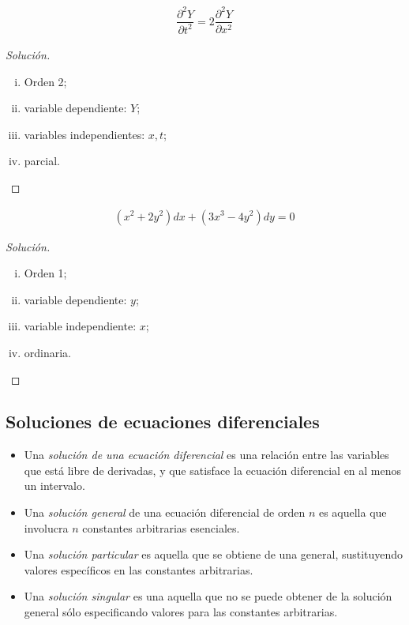 

\begin{align*}
	\dfrac{\partial^{2}Y}{\partial t^{2}} = 2\dfrac{\partial^{2}Y}{\partial x^{2}}
\end{align*}
\begin{proof}[Solución]
	\begin{enumerate}[(i)]
		\item Orden 2;
		\item variable dependiente: $ Y $;
		\item variables independientes: $ x,t $;
		\item parcial.
	\end{enumerate}
\end{proof}



\begin{align*}
	\left(x^{2}+2y^{2}\right)dx +\left(3x^{3}-4y^{2}\right)dy=0
\end{align*}
\begin{proof}[Solución]
	\begin{enumerate}[(i)]
		\item Orden 1;
		\item variable dependiente: $ y  $;
		\item variable independiente: $ x $;
		\item ordinaria.
	\end{enumerate}
\end{proof}



\subsection{Soluciones de ecuaciones diferenciales}

\begin{itemize}
	\item 	Una \emph{solución de una ecuación diferencial} es una relación entre las variables que está libre de derivadas, y que satisface la ecuación diferencial en al menos un intervalo.
	\item
	Una \emph{solución general} de una ecuación diferencial de orden $ n $ es aquella que involucra $ n $ constantes arbitrarias esenciales.
	\item 	Una \emph{solución particular} es aquella que se obtiene de una general, sustituyendo valores específicos en las constantes arbitrarias.
	\item 	Una \emph{solución singular} es una aquella que no se puede obtener de la solución general sólo especificando valores para las constantes arbitrarias.
\end{itemize}

